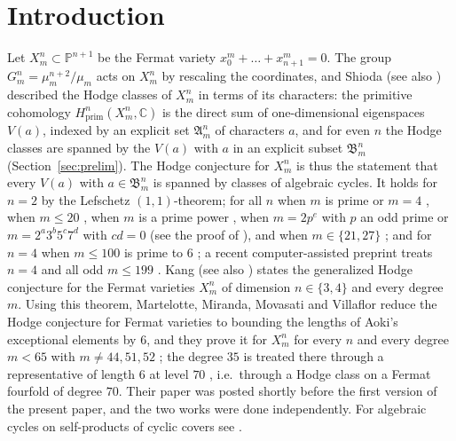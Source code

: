 \documentclass[11pt]{amsart}
\theoremstyle{definition}
\theoremstyle{remark}
\numberwithin{equation}{section}
\newcommand{\C}{\mathbb{C}}
\newcommand{\PP}{\mathbb{P}}
\newcommand{\fA}{\mathfrak{A}}
\newcommand{\fB}{\mathfrak{B}}
\begin{document}
\section{Introduction}\label{sec:intro}

Let $X^n_m\subset\PP^{n+1}$ be the Fermat variety $x_0^m+\dots+x_{n+1}^m=0$. The group $G^n_m=\mu_m^{n+2}/\mu_m$ acts on $X^n_m$ by rescaling the coordinates, and Shioda \cite{Sh79} (see also \cite{Ra80,SK79}) described the Hodge classes of $X^n_m$ in terms of its characters: the primitive cohomology $H^n_{\mathrm{prim}}(X^n_m,\C)$ is the direct sum of one-dimensional eigenspaces $V(a)$, indexed by an explicit set $\fA^n_m$ of characters $a$, and for even $n$ the Hodge classes are spanned by the $V(a)$ with $a$ in an explicit subset $\fB^n_m$ (Section~\ref{sec:prelim}). The Hodge conjecture for $X^n_m$ is thus the statement that every $V(a)$ with $a\in\fB^n_m$ is spanned by classes of algebraic cycles. It holds for $n=2$ by the Lefschetz $(1,1)$-theorem; for all $n$ when $m$ is prime or $m=4$ \cite{Ra80,Sh79}, when $m\le 20$ \cite{Sh79}, when $m$ is a prime power \cite[Cor.~2-3]{Ao87}, when $m=2p^e$ with $p$ an odd prime or $m=2^a3^b5^c7^d$ with $cd=0$ (see the proof of \cite[Thm.~0.1]{Ao00}), and when $m\in\{21,27\}$ \cite{dS21}; and for $n=4$ when $m\le 100$ is prime to $6$ \cite{dS21}; a recent computer-assisted preprint treats $n=4$ and all odd $m\le 199$ \cite{Jum26a}. Kang \cite[Cor.~3.2]{Ka16} (see also \cite{Ka15}) states the generalized Hodge conjecture for the Fermat varieties $X^n_m$ of dimension $n\in\{3,4\}$ and every degree $m$. Using this theorem, Martelotte, Miranda, Movasati and Villaflor \cite{MMMV26} reduce the Hodge conjecture for Fermat varieties to bounding the lengths of Aoki's exceptional elements by $6$, and they prove it for $X^n_m$ for every $n$ and every degree $m<65$ with $m\ne44,51,52$ \cite[Thm.~1.1]{MMMV26}; the degree $35$ is treated there through a representative of length $6$ at level $70$ \cite[Table~4, Prop.~4.3]{MMMV26}, i.e.\ through a Hodge class on a Fermat fourfold of degree $70$. Their paper was posted shortly before the first version of the present paper, and the two works were done independently. For algebraic cycles on self-products of cyclic covers see \cite{Sch88}.
\end{document}
